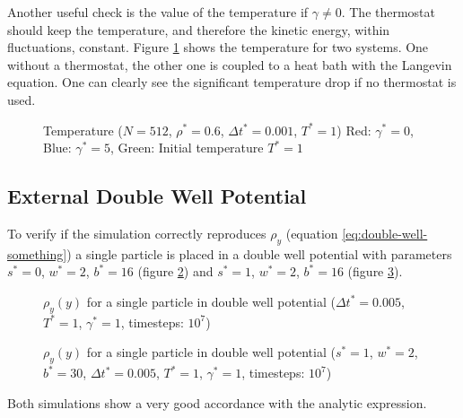 \documentclass[a4paper]{article}
\begin{document}
Another useful check is the value of the temperature if $\gamma \neq 0$. The thermostat should keep the temperature, and therefore the kinetic energy, within fluctuations, constant. Figure \ref{im:temperature} shows the temperature for two systems. One without a thermostat, the other one is coupled to a heat bath with the Langevin equation. One can clearly see the significant temperature drop if no thermostat is used.

\begin{figure} [H]
\centering
\scalebox{1.1}{}
\caption{Temperature ($N = 512$, $\rho^* = 0.6$, $\Delta t^* = 0.001$, $T^* = 1$) Red: $\gamma^* = 0$, Blue: $\gamma^* = 5$, Green: Initial temperature $T^* = 1$}
\label{im:temperature}
\end{figure}

\subsection{External Double Well Potential}

To verify if the simulation correctly reproduces $\rho_y$ (equation \ref{eq:double-well-something}) a single particle is placed in a double well potential with parameters $s^* = 0$, $w^* = 2$, $b^* = 16$ (figure \ref{im:distribution_double_well}) and $s^* = 1$, $w^* = 2$, $b^* = 16$ (figure \ref{im:distribution_double_well_2}). 

\begin{figure} [H]
\centering
\scalebox{.9}{}
\caption{$\rho_y(y)$ for a single particle in double well potential ($\Delta t^* = 0.005$, $T^* = 1$, $\gamma^* = 1$, timesteps: $10^7$)}
\label{im:distribution_double_well}
\end{figure}

\begin{figure} [H]
\centering
\scalebox{.9}{}
\caption{$\rho_y(y)$ for a single particle in double well potential ($s^* = 1$, $w^* = 2$, $b^* = 30$, $\Delta t^* = 0.005$, $T^* = 1$, $\gamma^* = 1$, timesteps: $10^7$)}
\label{im:distribution_double_well_2}
\end{figure}

Both simulations show a very good accordance with the analytic expression.

\begin{comment}
\subsection{Gaussian Chain}

The Gaussian distribution (equation \ref{eq:distribution2-rouse}) is checked with the distance between the first two beads of a polymer ($N = 10$) and compared to the analytic expression. The result is shown in figure \ref{im:distribution}.

\begin{figure} [H]
\centering
\scalebox{.6}{}
\caption{End-to-end distribution between the first and second bead ($\gamma^* = 1$, $N = 10$, $\Delta t^* = 0.001$, $T^* = 1$)}
\label{im:distribution}
\end{figure}
\end{comment}
\newpage
\end{document}
